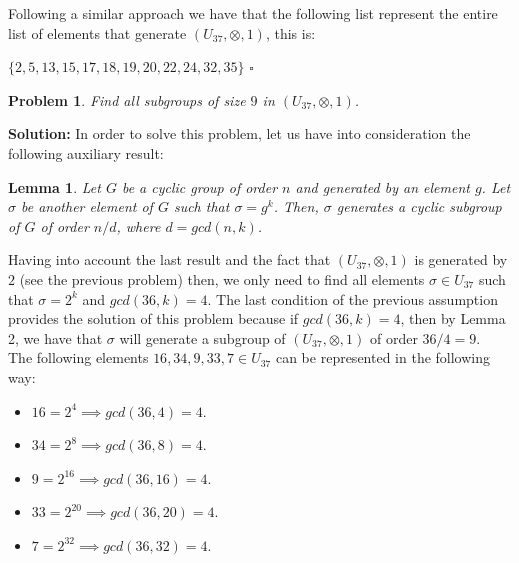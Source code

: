\documentclass[a4paper,openany,11pt]{book}
\newtheorem{Lemma}{Lemma}
\newtheorem{Prob}{Problem}
\begin{document}
Following a similar approach we have that the following list represent the entire list of elements that generate $(U_{37},\otimes, 1)$, this is:

\begin{center}
	$\lbrace 2, 5, 13, 15, 17, 18, 19, 20, 22, 24 , 32, 35 \rbrace$\hspace{0.1cm} $\square$
\end{center}

\begin{Prob}
	Find all subgroups of size $9$ in $(U_{37}, \otimes, 1)$.
\end{Prob}

\textbf{Solution:} In order to solve this problem, let us have into consideration the following auxiliary result:

\begin{Lemma}
	Let $G$ be a cyclic group of order $n$ and generated by an element $g$. Let $\sigma$ be another element of $G$ such that $\sigma = g^{k}$. Then, $\sigma$ generates a cyclic subgroup of $G$ of order $n/d$, where $d = gcd(n,k)$.
\end{Lemma}

Having into account the last result and the fact that $(U_{37}, \otimes, 1)$ is generated by $2$ (see the previous problem) then, we only need to find all elements $\sigma \in U_{37}$ such that $\sigma = 2^{k}$ and $gcd(36,k) = 4$. The last condition of the previous assumption provides the solution of this problem because if $gcd(36,k) = 4$, then by Lemma 2, we have that $\sigma$ will generate a subgroup of $(U_{37}, \otimes, 1)$ of order $36/4 = 9$.\\

The following elements $16, 34, 9, 33, 7 \in U_{37}$ can be represented in the following way:

\begin{itemize}
	\item $16 = 2^{4} \implies gcd(36,4) = 4$.
	
	\item $34 = 2^{8} \implies gcd(36,8) = 4$.
	
	\item $9 = 2^{16} \implies gcd(36,16) = 4$.
	
	\item $33 = 2^{20} \implies gcd(36,20) = 4$.
	
	\item $7 = 2^{32} \implies gcd(36,32) = 4$.
\end{itemize}
\end{document}

